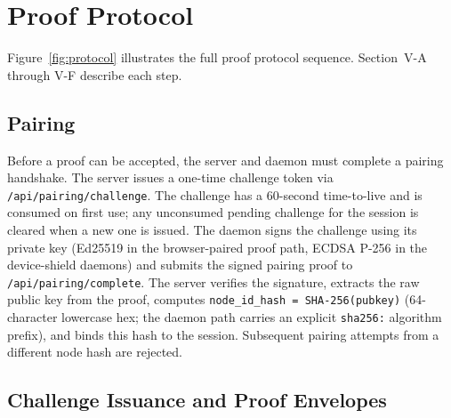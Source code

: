 \documentclass[conference]{IEEEtran}
\begin{document}
\section{Proof Protocol}

Figure~\ref{fig:protocol} illustrates the full proof protocol sequence. Section~V-A through V-F describe each step.

\subsection{Pairing}

Before a proof can be accepted, the server and daemon must complete a pairing handshake. The server issues a one-time challenge token via \texttt{/api/pairing/challenge}. The challenge has a 60-second time-to-live and is consumed on first use; any unconsumed pending challenge for the session is cleared when a new one is issued. The daemon signs the challenge using its private key (Ed25519 in the browser-paired proof path, ECDSA P-256 in the device-shield daemons) and submits the signed pairing proof to \texttt{/api/pairing/complete}. The server verifies the signature, extracts the raw public key from the proof, computes \texttt{node\_id\_hash~=~SHA-256(pubkey)} (64-character lowercase hex; the daemon path carries an explicit \texttt{sha256:} algorithm prefix), and binds this hash to the session. Subsequent pairing attempts from a different node hash are rejected.

\subsection{Challenge Issuance and Proof Envelopes}
\end{document}
